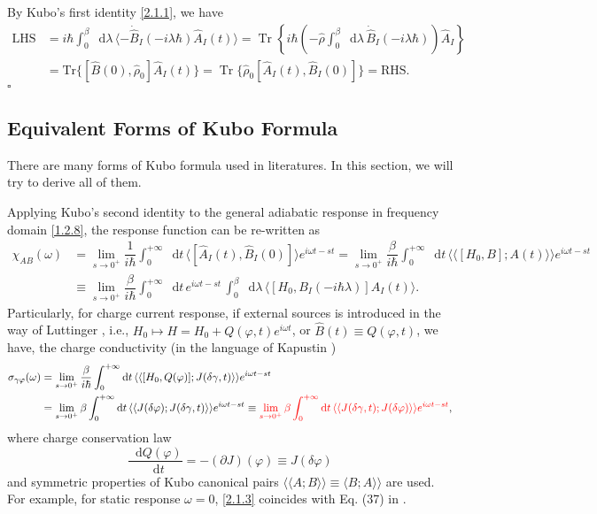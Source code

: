 \documentclass[10pt,nofootinbib,letterpaper]{revtex4}
\newcommand*\dd{\mathop{}\!\mathrm{d}}
\newenvironment{Proof}{{\par~{\normalfont\bfseries $\vartriangleright$}~~}}{\hfill $\square$\par\hfill\par} %
\begin{document}
		\begin{Proof}
			By Kubo's first identity \eqref{2.1.1}, we have
			\begin{align*}
				\text{LHS}&=i\hbar\int_0^\beta\dd\lambda\,\langle-\dot{\hat B}_I(-i\lambda\hbar)\hat A_I(t)\rangle=\mathop{\mathrm{Tr}}\left\{i\hbar\left(-\hat\rho\int_0^\beta\dd\lambda\,\dot{\hat B}_I(-i\lambda\hbar)\right)\hat A_I\right\}\\
				&=\mathrm{Tr}\{[\hat B(0),\hat\rho_0]\hat A_I(t)\}=\mathop{\mathrm{Tr}}\{\hat\rho_0[\hat A_I(t),\hat B_I(0)]\}=\text{RHS}.
			\end{align*}
		\end{Proof}

	\subsection{Equivalent Forms of Kubo Formula}
		There are many forms of Kubo formula used in literatures. In this section, we will try to derive all of them.\par
		Applying Kubo's second identity to the general adiabatic response in frequency domain \eqref{1.2.8}, the response function can be re-written as
		\begin{align}
			\chi_{AB}(\omega)&=\lim_{s \rightarrow0^+}\dfrac{1}{i\hbar}\int_0^{+\infty}\dd t\,\langle[\hat A_I(t),\hat B_I(0)]\rangle e^{i\omega t-st}=\lim_{s \rightarrow0^+}\dfrac{\beta}{i\hbar}\int_0^{+\infty}\dd t\,\langle\langle[H_0, B]; A(t)\rangle\rangle e^{i\omega t-st}\nonumber\\
			&\equiv\lim_{s \rightarrow0^+}\dfrac{\beta}{i\hbar}\int_0^{+\infty}\dd t\, e^{i\omega t-st}\,\int_0^\beta\dd\lambda\,\langle[H_0,B_I(-i\hbar\lambda)]A_I(t)\rangle.\label{2.1.2}
		\end{align}
		\indent Particularly, for charge current response, if external sources is introduced in the way of Luttinger \cite{luttinger1964theory}, i.e., $H_0\mapsto H=H_0+Q(\varphi,t)e^{i\omega t}$, or $\hat B(t)\equiv Q(\varphi,t)$, we have, the charge conductivity (in the language of Kapustin \cite{kapustin2020thermal})
		\begin{align}
			\sigma_{\gamma\varphi}(\omega)&=\lim_{s \rightarrow0^+}\dfrac{\beta}{i\hbar}\int_0^{+\infty}\dd t\,\langle\langle[H_0, Q(\varphi)]; J(\delta\gamma,t)\rangle\rangle e^{i\omega t-st}\nonumber\\
			&=\lim_{s \rightarrow0^+}\beta\int_0^{+\infty}\dd t\,\langle\langle J(\delta\varphi); J(\delta\gamma,t)\rangle\rangle e^{i\omega t-st}\equiv{\color{red}\lim_{s \rightarrow0^+}\beta\int_0^{+\infty}\dd t\,\langle\langle J(\delta\gamma,t); J(\delta\varphi)\rangle\rangle e^{i\omega t-st}},\label{2.1.3}
		\end{align}
		where charge conservation law
		\begin{equation}\label{2.1.4}
			\dfrac{\dd Q(\varphi)}{\dd t}=-(\partial J)(\varphi)\equiv J(\delta\varphi)
		\end{equation}
		and symmetric properties of Kubo canonical pairs $\langle\langle A;B\rangle\rangle\equiv\langle B;A\rangle\rangle$ are used. For example, for static response $\omega=0$, \eqref{2.1.3} coincides with {\color{blue}Eq. (37)} in \cite{kapustin2020thermal}.
\end{document}
